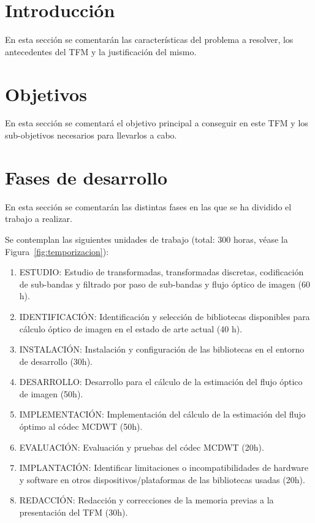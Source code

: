 \documentclass[titlepage, 12pt, a4paper, oneside]{article}
\begin{document}
\normalsize

\section{Introducción}
\cite{einstein1922kosmologische}
En esta sección se comentarán las características del problema a resolver, los antecedentes del TFM y la justificación del mismo.

\section{Objetivos}
En esta sección se comentará el objetivo principal a conseguir en este TFM y los sub-objetivos necesarios para llevarlos a cabo.

\section{Fases de desarrollo}
En esta sección se comentarán las distintas fases en las que se ha dividido el trabajo a realizar.

Se contemplan las siguientes unidades de trabajo (total: 300 horas, véase la Figura~\ref{fig:temporizacion}):
\begin{enumerate}
  \item {ESTUDIO:} Estudio de transformadas, transformadas discretas,
    codificación de sub-bandas y filtrado por paso de sub-bandas y
    flujo óptico de imagen (60 h).
  \item {IDENTIFICACIÓN}: Identificación y selección de bibliotecas disponibles para
    cálculo óptico de imagen en el estado de arte actual (40 h).
  \item {INSTALACIÓN}: Instalación y configuración de las bibliotecas en el entorno
    de desarrollo (30h).
  \item {DESARROLLO}: Desarrollo para el cálculo de la estimación del flujo óptico
    de imagen (50h).
  \item {IMPLEMENTACIÓN}: Implementación del cálculo de la estimación del flujo óptimo
    al códec MCDWT (50h).
  \item {EVALUACIÓN}: Evaluación y pruebas del códec MCDWT (20h).
  \item {IMPLANTACIÓN}: Identificar limitaciones o incompatibilidades de hardware y
    software en otros dispositivos/plataformas de las bibliotecas
    usadas (20h).
  \item {REDACCIÓN}: Redacción y correcciones de la memoria previas a la
    presentación del TFM (30h).
\end{enumerate}
\end{document}
